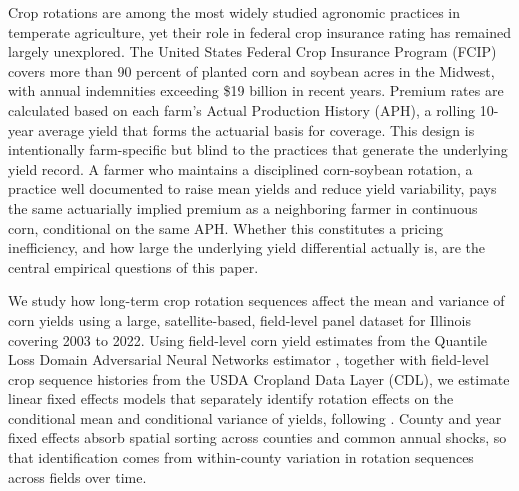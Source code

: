 \documentclass[12pt,letterpaper]{article}
\theoremstyle{remark}
\theoremstyle{remark}
\theoremstyle{plain}
\theoremstyle{definition}
\begin{document}
Crop rotations are among the most widely studied agronomic practices in temperate agriculture, yet their role in federal crop insurance rating has remained largely unexplored. The United States Federal Crop Insurance Program (FCIP) covers more than 90 percent of planted corn and soybean acres in the Midwest, with annual indemnities exceeding \$19 billion in recent years. Premium rates are calculated based on each farm's Actual Production History (APH), a rolling 10-year average yield that forms the actuarial basis for coverage. This design is intentionally farm-specific but blind to the practices that generate the underlying yield record. A farmer who maintains a disciplined corn-soybean rotation, a practice well documented to raise mean yields and reduce yield variability, pays the same actuarially implied premium as a neighboring farmer in continuous corn, conditional on the same APH. Whether this constitutes a pricing inefficiency, and how large the underlying yield differential actually is, are the central empirical questions of this paper.
 
We study how long-term crop rotation sequences affect the mean and variance of corn yields using a large, satellite-based, field-level panel dataset for Illinois covering 2003 to 2022. Using field-level corn yield estimates from the Quantile Loss Domain Adversarial Neural Networks estimator \citep[QDANN;][]{Ma2024}, together with field-level crop sequence histories from the USDA Cropland Data Layer (CDL), we estimate linear fixed effects models that separately identify rotation effects on the conditional mean and conditional variance of yields, following \citet{Just1979}. County and year fixed effects absorb spatial sorting across counties and common annual shocks, so that identification comes from within-county variation in rotation sequences across fields over time.
 
\end{document}
